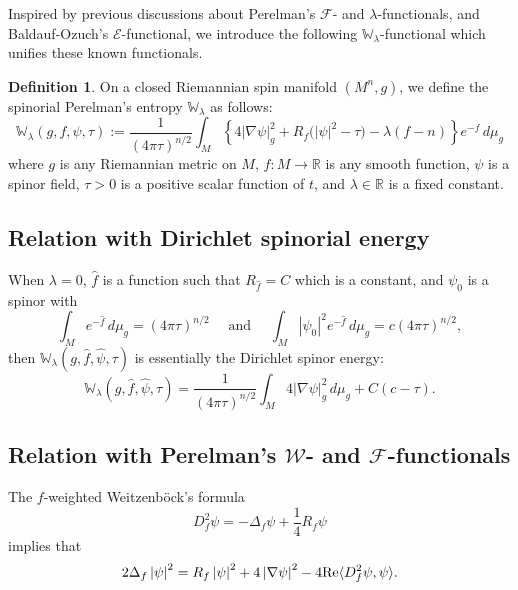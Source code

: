 \documentclass{amsart}
\theoremstyle{definition}
\newtheorem{definition}[theorem]{Definition}
\theoremstyle{remark}
\numberwithin{equation}{section}
\newcommand{\abs}[1]{\left|#1\right|}
\newcommand{\R}{\mathbb{R}}
\begin{document}
Inspired by previous discussions about Perelman's $\mathcal{F}$- and $\lambda$-functionals, and Baldauf-Ozuch's $\mathcal{E}$-functional, we introduce the following $\mathbb{W}_\lambda$-functional which unifies these known functionals.
\begin{definition}
On a closed Riemannian spin manifold $(M^n, g)$, we define the spinorial Perelman's entropy $\mathbb{W}_\lambda$ as follows:
\begin{equation}
\label{def:generalform}
\mathbb{W}_\lambda(g,f,\psi,\tau) := \frac{1}{(4\pi\tau)^{n/2}}\int_M \left\{4\abs{\nabla\psi}^2_g + R_f\big(\abs{\psi}^2-\tau\big) - \lambda(f-n)\right\}e^{-f}\,d\mu_g
\end{equation}
where $g$ is any Riemannian metric on $M$, $f : M \to \R$ is any smooth function, $\psi$ is a spinor field, $\tau > 0$ is a positive scalar function of $t$, and $\lambda \in \R$ is a fixed constant.
\end{definition}

\subsection{Relation with Dirichlet spinorial energy}
When $\lambda = 0$, $\hat{f}$ is a function such that $R_{\hat{f}} = C$ which is a constant, and $\psi_0$ is a spinor with
\[\int_M e^{-\hat{f}}\,d\mu_g = (4\pi\tau)^{n/2} \quad \text{ and } \quad \int_M \abs{\psi_0}^2 e^{-\hat{f}}\,d\mu_g = c(4\pi\tau)^{n/2},\]
then $\mathbb{W}_\lambda(g,\hat{f},\hat{\psi},\tau)$ is essentially the Dirichlet spinor energy:
\[\mathbb{W}_\lambda(g,\hat{f},\hat{\psi},\tau) = \frac{1}{(4\pi\tau)^{n/2}}\int_M 4\abs{\nabla\psi}_g^2 \,d\mu_g + C(c-\tau).\]

\subsection{Relation with Perelman's $\mathcal{W}$- and $\mathcal{F}$-functionals}
The $f$-weighted Weitzenb\"ock's formula
\begin{equation}
\label{eq:f-Weitzenbock}
D_f^2\psi = -\Delta_f \psi + \frac{1}{4}R_f\psi	
\end{equation}
implies that
\begin{equation}
\label{eq:f-Weitzenbock-with-norm}
2\Delta_f \abs{\psi}^2  =   R_f \abs{\psi}^2  + 4\abs{\nabla\psi}^2 - 4\textup{Re} \langle D_f^2 \psi ,\psi\rangle.	
\end{equation}
\end{document}
